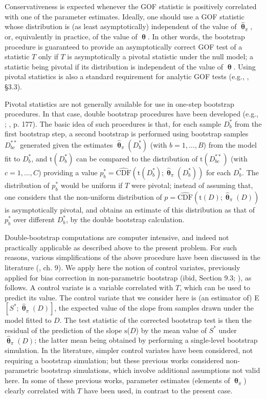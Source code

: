 \documentclass[a4paper]{article}\usepackage[]{graphicx}\usepackage[]{color}
\newcommand{\data}{\ensuremath{D}}
\newcommand{\datab}{\ensuremath{D_{b}^*}}
\newcommand{\databb}{\ensuremath{D_{bc}^{**}}}
\newcommand{\boo}[1]{\ensuremath{{#1}_{b}^{*}}}
\newcommand{\CDF}{\ensuremath{\mathrm{CDF}}}
\newcommand{\sfn}{\ensuremath{\mathrm{s}}}
\newcommand{\tfn}{\ensuremath{\mathrm{t}}}
\newcommand{\bth}{\ensuremath{\bm{\uptheta}}}
\begin{document}
Conservativeness is expected whenever the GOF statistic is positively correlated with one of the parameter estimates. Ideally, one should use a GOF statistic whose distribution is (as least asymptotically) independent of the value of $\hat{\bth}_\pi$, or, equivalently in practice, of the value of $\bth$. In other words, the bootstrap procedure is guaranteed to provide an asymptotically correct GOF test of a statistic $T$ only if $T$ is asymptotically a pivotal statistic under the null model; a statistic being pivotal if its distribution is independent of the value of $\bth$. Using pivotal statistics is also a standard requirement for analytic GOF tests (e.g., \citealp{CoxH74}, §3.3).

Pivotal statistics are not generally available for use in one-step bootstrap procedures. In that case, double bootstrap procedures have been developed (e.g., \citealp{Beran88}; \citealp{DavisonH97}, p. 177).  The basic idea of such procedures is that, for each sample $\datab$ from the first bootstrap step, a second bootstrap is performed using bootstrap samples $\databb$ generated given the estimates $\hat{\bth}_\pi(\datab)$ (with $b=1,\ldots,B$) from the model fit to $\datab$, and $\tfn(\datab)$ can be compared to the distribution of $\tfn(\databb)$ (with $c=1,\ldots,C$) providing a value $\boo{p} = \hat{\CDF}(\tfn(\datab);\hat{\bth}_\pi(\datab) )$ for each $\datab$. The distribution of $\boo{p}$ would be uniform if $T$ were pivotal; instead of assuming that, one considers that the non-uniform distribution of $p= \hat{\CDF}(\tfn(\data);\hat{\bth}_\pi(\data))$ is asymptotically pivotal, and obtains an estimate of this distribution as that of \boo{p} over different $\datab$, by the double bootstrap calculation.

Double-bootstrap computations are computer intensive, and indeed not practically applicable as described above to the present problem. For such reasons, various simplifications of the above procedure have been discussed in the literature (\citealp{DavisonH97}, ch. 9). We apply here the notion of control variates, previously applied for bias correction in non-parametric bootstrap (ibid, Section 9.3; \citealp{Efron90}), as follows. A control variate is a variable correlated with $T$, which can be used to predict its value. The control variate that we consider here is (an estimator of) E$[S^*;\hat{\bth}_\pi(\data)]$, the expected value of the slope from samples drawn under the model fitted to \data. The test statistic of the corrected bootstrap test is then the residual of the prediction of the slope \sfn(\data)  by the mean value of $S^*$ under $\hat{\bth}_\pi(\data)$; the latter mean being obtained by performing a single-level bootstrap simulation. In the literature, simpler control variates have been considered, not requiring a bootstrap simulation; but these previous works considered non-parametric bootstrap simulations, which involve additional assumptions not valid here. In some of these previous works, parameter estimates (elements of $\hat{\bth}_\pi$) clearly correlated with $T$ have been used, in contrast to the present case.
\end{document}
